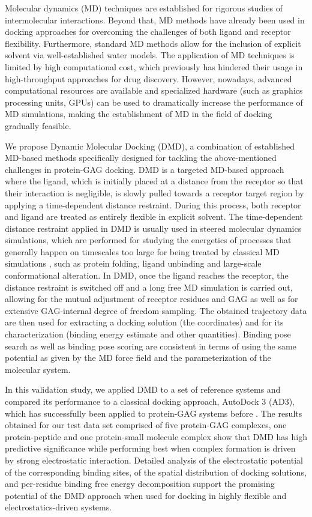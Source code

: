 Molecular dynamics (MD) techniques are established for rigorous studies of intermolecular interactions\cite{karplus_molecular_2005}.
Beyond that, MD methods have already been used in docking approaches
for overcoming the challenges of both ligand and receptor flexibility\cite{chaudhuri_application_2012, antes_dynadock_2010}.
Furthermore, standard MD methods
allow for the inclusion of explicit solvent via well-established water models.
The application of MD techniques is limited by high computational cost, which previously
has hindered their usage in high-throughput approaches for drug discovery.
However, nowadays, advanced computational resources are
available and specialized hardware (such as graphics processing units, GPUs) can
be used to dramatically increase the performance of MD simulations, making the
establishment of MD in the field of docking gradually feasible.


We propose Dynamic Molecular Docking (DMD), a combination of established MD-based
methods specifically designed for tackling the above-mentioned challenges in protein-GAG
docking.
DMD is a targeted MD-based approach where the ligand, which is initially
placed at a distance from the receptor so that their interaction is negligible,
is slowly pulled towards a receptor target region by applying a
time-dependent distance restraint. During this process, both receptor
and ligand are treated as entirely flexible in explicit solvent. The time-dependent distance
restraint applied in DMD is usually used in steered molecular dynamics
simulations, which are performed for studying the energetics of
processes that generally happen on timescales too large for being treated by
classical MD simulations \cite{xiong_free_2006}, such as protein folding, ligand
unbinding and large-scale conformational alteration. In DMD, once the ligand reaches
the receptor, the distance restraint is switched off and a long free MD simulation is carried out,
allowing for the mutual adjustment of receptor residues and GAG as well as for
extensive GAG-internal degree of freedom sampling.
The obtained trajectory data are then used for extracting a
docking solution (the coordinates) and for its characterization
(binding energy estimate and other quantities).
Binding pose search as
well as binding pose scoring are consistent in terms of using the same potential
as given by the MD force field and the parameterization of the molecular system.

In this validation study, we applied DMD to a set of reference systems and compared its
performance to a classical docking approach, AutoDock 3 (AD3), which has successfully been applied to protein-GAG systems before {\cite{japan_docking_ad3_clustering, samsonov_docking_2011,
pichert_characterization_2012}}. The results obtained for our test data set comprised of
five protein-GAG complexes, one protein-peptide and one protein-small molecule complex show
that DMD has high predictive significance
while performing best when complex formation is driven by strong electrostatic
interaction. Detailed analysis of the electrostatic potential of the
corresponding binding sites, of the spatial distribution of docking solutions, and
per-residue binding free energy decomposition support the promising potential of
the DMD approach when used for docking in highly flexible and electrostatics-driven
systems.
